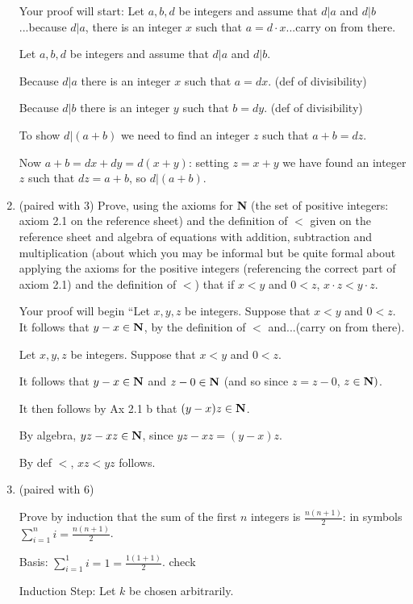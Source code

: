 \documentclass[12pt]{article}
\begin{document}
\begin{enumerate}
Your proof will start:  Let $a,b,d$ be integers and assume that $d|a$ and $d|b$...because $d|a$, there is an integer $x$ such that $a=d\cdot x$...carry on from there.

Let $a,b,d$ be integers and assume that $d|a$ and $d|b$.  

Because $d|a$ there is an integer $x$ such that $a=dx$. (def of divisibility)

Because $d|b$ there is an integer $y$ such that $b=dy$. (def of divisibility)

To show $d|(a+b)$ we need to find an integer $z$ such that $a+b=dz$.

Now $a+b = dx+dy = d(x+y)$:  setting $z=x+y$ we have found an integer $z$ such that $dz=a+b$, so $d|(a+b)$.

\newpage

\item (paired with 3)  Prove, using the axioms for {\bf N} (the set of positive integers:  axiom 2.1 on the reference sheet) and the definition of $<$ given on the reference sheet and algebra of equations with addition, subtraction and multiplication (about which you may be informal but be quite formal about applying the axioms for the positive integers (referencing the correct part of axiom 2.1) and the definition of $<$) that if $x<y$ and $0<z$, $x\cdot z <y\cdot z$.

Your proof will begin ``Let $x,y,z$ be integers.  Suppose that $x<y$ and $0<z$.  It follows that $y-x \in {\bf N}$, by the definition of $<$  and...(carry on from there).

Let $x,y,z$ be integers.  Suppose that $x<y$ and $0<z$. 

It follows that $y-x \in {\bf N}$ and $z-0 \in {\bf N}$ (and so since $z=z-0$, $z \in {\bf N})$.

It then follows by Ax 2.1 b that $(y-x)z \in {\bf N}$.

By algebra, $yz -xz \in {\bf N}$, since $yz-xz = (y-x)z$.

By def $<$, $xz<yz$ follows.

\newpage

\item (paired with 6)  

Prove by induction that the sum of the first $n$ integers is $\frac{n(n+1)}2$:  in symbols $\sum_{i=1}^n i = \frac{n(n+1)}2$.

Basis:  $\sum_{i=1}^1 i = 1 = \frac{1(1+1)}2$. check

Induction Step:  Let $k$ be chosen arbitrarily.


\end{enumerate}
\end{document}
